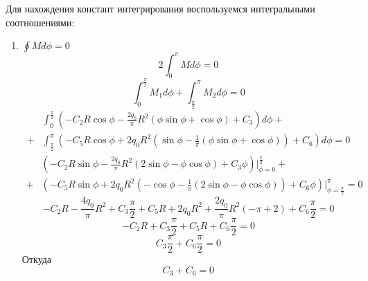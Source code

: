 Для нахождения констант интегрирования воспользуемся интегральными соотношениями:
\begin{enumerate}
    \item $\oint M d \phi = 0$
    \begin{equation}
        \label{eq32}
        2 \int_{0}^{\pi}{M d \phi} = 0
    \end{equation}
    \begin{equation}
        \label{eq33}
        \int_{0}^{\frac{\pi}{2}}{M_1 d \phi} + \int_{\frac{\pi}{2}}^{\pi}{M_2 d \phi} = 0
    \end{equation}
    \begin{equation}
        \label{eq34}
        \begin{split}
            & \int_{0}^{\frac{\pi}{2}}{(-C_2R \cos \phi - \frac{2q_0}{\pi}R^2 (\phi \sin \phi + \cos \phi) + C_3)d \phi} +
            \\
            + & \int_{\frac{\pi}{2}}^{\pi}{(-C_5R \cos \phi + 2q_0R^2 (\sin \phi - \frac{1}{\pi}(\phi \sin \phi + \cos \phi)) + C_6)d \phi} = 0
        \end{split}
    \end{equation}
    \begin{equation}
        \label{eq35}
        \begin{split}
            & (-C_2R \sin \phi - \frac{2q_0}{\pi}R^2(2\sin \phi - \phi \cos \phi) + C_3 \phi) |_{\phi = 0}^\frac{\pi}{2} +
            \\
            + & (-C_5R \sin \phi + 2q_0R^2 (-\cos \phi - \frac{1}{\pi} (2\sin \phi - \phi \cos \phi)) + C_6 \phi) |_{\phi = \frac{\pi}{2}}^\pi = 0
        \end{split}
    \end{equation}
    \begin{equation}
        \label{eq36}
        -C_2R - \frac{4q_0}{\pi}R^2 + C_3 \frac{\pi}{2} + C_5R + 2q_0R^2 + \frac{2q_0}{\pi}R^2 (-\pi + 2) + C_6 \frac{\pi}{2} = 0
    \end{equation}
    \begin{equation}
        \label{eq37}
        -C_2R + C_3 \frac{\pi}{2} + C_5R + C_6 \frac{\pi}{2} = 0
    \end{equation}
    \begin{equation}
        \label{eq38}
        C_3 \frac{\pi}{2} + C_6 \frac{\pi}{2} = 0
    \end{equation}
    Откуда
    \begin{equation}
        \label{eq39}
        C_3 + C_6 = 0
    \end{equation}

\end{enumerate}
